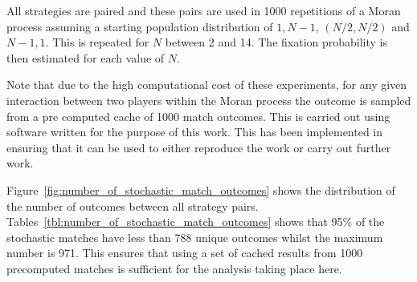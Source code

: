 \documentclass{article}
\begin{document}
All strategies are paired and these pairs are used in 1000 repetitions of a
Moran process assuming a starting population distribution of \(1, N-1 \),
\((N/2, N/2)\) and \(N-1 , 1\). This is repeated for \(N\) between 2 and 14. The
fixation probability is then estimated for each value of \(N\).

Note that due to the high computational cost of these experiments, for any given
interaction between two players within the Moran process the outcome is sampled
from a pre computed cache of 1000 match outcomes. This is carried out using
software written for the purpose of this work. This has been
implemented in~\cite{axelrodproject} ensuring that it can be used to either
reproduce the work or carry out further work.

Figure~\ref{fig:number_of_stochastic_match_outcomes} shows the distribution of
the number of outcomes between all strategy pairs.
Tables~\ref{tbl:number_of_stochastic_match_outcomes} shows that 95\% of the
stochastic matches have less than 788 unique outcomes whilst the maximum number
is 971. This ensures that using a set of cached results from 1000 precomputed
matches is sufficient for the analysis taking place here.
\end{document}
